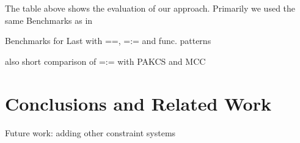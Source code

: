 \documentclass{llncs}
\begin{document}
The table above shows the evaluation of our approach. Primarily we
used the same Benchmarks as in \cite{}   

Benchmarks for Last with ==, =:= and func. patterns

also short comparison of =:= with PAKCS and MCC


\section{Conclusions and Related Work}
\label{sec:Conclusions}

Future work: adding other constraint systems




\end{document}
